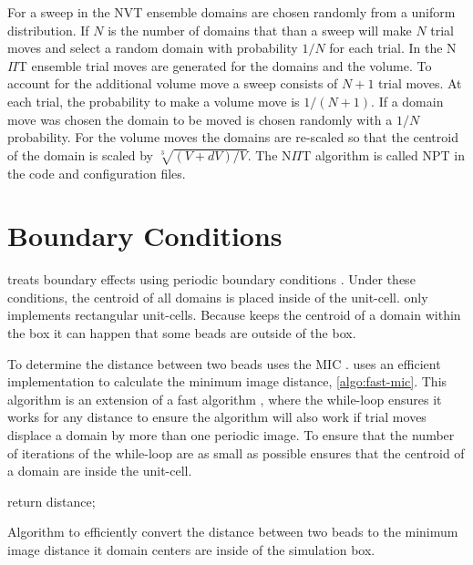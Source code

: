 \documentclass[12pt, twoside]{report}
\begin{document}
For a sweep in the NVT ensemble domains are chosen randomly from a uniform
distribution. If \(N\) is the number of domains that than a sweep will make
\(N\) trial moves and select a random domain with probability \(1/N\) for each
trial. In the N\(\Pi\)T ensemble trial moves are generated for the domains and
the volume. To account for the additional volume move a sweep consists of
\(N+1\) trial moves. At each trial, the probability to make a volume move is
\(1/(N+1)\). If a domain move was chosen the domain to be moved is chosen
randomly with a \(1/N\) probability. For the volume moves the domains are
re-scaled so that the centroid of the domain is scaled by
\(\sqrt[3]{(V+dV)/V}\). The N\(\Pi\)T algorithm is called NPT in the code and
configuration files.

\section{Boundary Conditions}

\complexes treats boundary effects using periodic boundary conditions
\cite{frenkel2001understanding}. Under these conditions, the centroid of all
domains is placed inside of the unit-cell. \complexes only implements
rectangular unit-cells. Because \complexes keeps the centroid of a domain within
the box it can happen that some beads are outside of the box.

To determine the distance between two beads \complexes uses the \gls{MIC}
\cite{frenkel2001understanding}. \complexes uses an efficient implementation to
calculate the minimum image distance, \cref{algo:fast-mic}. This algorithm is an
extension of a fast algorithm \cite{Deiters2013}, where the while-loop ensures
it works for any distance to ensure the algorithm will also work if trial moves
displace a domain by more than one periodic image. To ensure that the number of
iterations of the while-loop are as small as possible \complexes ensures that
the centroid of a domain are inside the unit-cell.
\begin{algorithm2e}[h!] \SetAlgoLined \DontPrintSemicolon {} { 
return distance; }
  \caption{Algorithm to efficiently convert the distance between two beads to
the minimum image distance it domain centers are inside of the simulation box.}
 \label{algo:fast-mic}
\end{algorithm2e}
\end{document}

